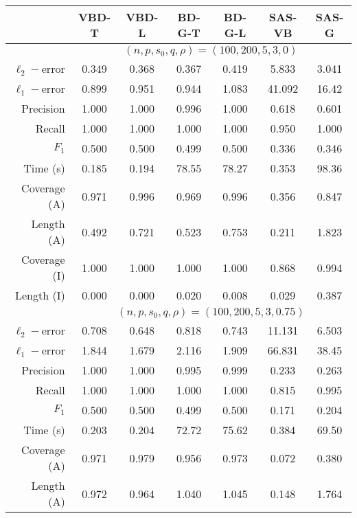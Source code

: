 \documentclass[11pt]{article}
\begin{document}
\begin{table}[h]
\centering

\begin{tabular}{r|cc|cc|cc}
\toprule
               & VBD-T & VBD-L & BD-G-T & BD-G-L & SAS-VB & SAS-G \\ \bottomrule
                & \multicolumn{6}{c}{$(n, p, s_0, q, \rho) = (100, 200, 5, 3, 0)$} \\\toprule
$\ell_2-$error & 0.349   & 0.368   & 0.367  & 0.419  & 5.833  & 3.041 \\
$\ell_1-$error & 0.899   & 0.951   & 0.944  & 1.083  & 41.092 & 16.42 \\ \hline
Precision      & 1.000   & 1.000   & 0.996  & 1.000  & 0.618  & 0.601 \\
Recall         & 1.000   & 1.000   & 1.000  & 1.000  & 0.950  & 1.000 \\
$F_1$          & 0.500   & 0.500   & 0.499  & 0.500  & 0.336  & 0.346 \\ \hline
Time (s)       & 0.185   & 0.194   & 78.55  & 78.27  & 0.353  & 98.36 \\ \hline
Coverage (A)   & 0.971   & 0.996   & 0.969  & 0.996  & 0.356  & 0.847 \\
Length (A)     & 0.492   & 0.721   & 0.523  & 0.753  & 0.211  & 1.823 \\ \hline
Coverage (I)   & 1.000   & 1.000   & 1.000  & 1.000  & 0.868  & 0.994 \\
Length (I)     & 0.000   & 0.000   & 0.020  & 0.008  & 0.029  & 0.387 \\ \bottomrule 
& \multicolumn{6}{c}{$(n, p, s_0, q, \rho) = (100, 200, 5, 3, 0.75)$} \\ \toprule
$\ell_2-$error & 0.708 & 0.648 & 0.818 & 0.743 & 11.131 & 6.503 \\
$\ell_1-$error & 1.844 & 1.679 & 2.116 & 1.909 & 66.831 & 38.45 \\ \hline
Precision      & 1.000 & 1.000 & 0.995 & 0.999 & 0.233  & 0.263 \\
Recall         & 1.000 & 1.000 & 1.000 & 1.000 & 0.815  & 0.995 \\
$F_1$          & 0.500 & 0.500 & 0.499 & 0.500 & 0.171  & 0.204 \\ \hline
Time (s)       & 0.203 & 0.204 & 72.72 & 75.62 & 0.384  & 69.50 \\ \hline
Coverage (A)   & 0.971 & 0.979 & 0.956 & 0.973 & 0.072  & 0.380 \\
Length (A)     & 0.972 & 0.964 & 1.040 & 1.045 & 0.148  & 1.764 \\\hline

\end{tabular}
\end{table}
\end{document}
